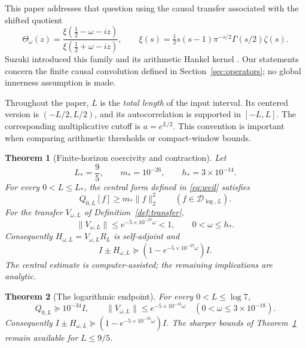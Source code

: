 \documentclass[11pt]{article}
\numberwithin{equation}{section}
\newtheorem{theorem}{Theorem}[section]
\theoremstyle{definition}
\theoremstyle{remark}
\newcommand{\DD}{\mathcal D}
\newcommand{\norm}[1]{\lVert#1\rVert}
\newcommand{\Lstar}{L_*}
\newcommand{\mstar}{m_*}
\newcommand{\hstar}{h_*}
\begin{document}
This paper addresses that question using the causal transfer associated with
the shifted quotient
\begin{equation}\label{eq:theta}
 \Theta_\omega(z)=
 \frac{\xi(\tfrac12-\omega-iz)}{\xi(\tfrac12+\omega-iz)},\qquad
 \xi(s)=\tfrac12s(s-1)\pi^{-s/2}\Gamma(s/2)\zeta(s).
\end{equation}
Suzuki introduced this family and its arithmetic Hankel kernel
\cite{Suzuki2016}. Our statements concern the finite causal convolution
defined in Section~\ref{sec:operators}; no global innerness assumption is made.

Throughout the paper, $L$ is the \emph{total length} of the input interval.
Its centered version is $(-L/2,L/2)$, and its autocorrelation is supported
in $[-L,L]$. The corresponding multiplicative cutoff is $a=e^{L/2}$.
This convention is important when comparing arithmetic thresholds or
compact-window bounds.

\begin{theorem}[Finite-horizon coercivity and contraction]\label{thm:main}
Let
\[
 \Lstar=\frac95,\qquad \mstar=10^{-26},\qquad \hstar=3\times10^{-14}.
\]
For every $0<L\le\Lstar$, the central form defined in
\eqref{eq:weil} satisfies
\begin{equation}\label{eq:maincentral}
 Q_{0,L}[f]\ge\mstar\norm f_2^2\qquad(f\in\DD_{\log,L}).
\end{equation}
For the transfer $V_{\omega,L}$ of Definition~\ref{def:transfer},
\begin{equation}\label{eq:maintransfer}
 \norm{V_{\omega,L}}\le e^{-5\times10^{-27}\omega}<1,
 \qquad 0<\omega\le\hstar.
\end{equation}
Consequently $H_{\omega,L}=V_{\omega,L}R_L$ is self-adjoint and
\begin{equation}\label{eq:mainreflection}
 I\pm H_{\omega,L}\succeq
 (1-e^{-5\times10^{-27}\omega})I.
\end{equation}
The central estimate is computer-assisted; the remaining implications are
analytic.
\end{theorem}

\begin{theorem}[The logarithmic endpoint]\label{thm:endpoint-main}
For every $0<L\le\log7$,
\[
 Q_{0,L}\succeq10^{-34}I,\qquad
 \norm{V_{\omega,L}}\le e^{-5\times10^{-35}\omega}
 \quad(0<\omega\le3\times10^{-18}).
\]
Consequently $I\pm H_{\omega,L}\succeq(1-e^{-5\times10^{-35}\omega})I$.
The sharper bounds of Theorem~\ref{thm:main} remain available for $L\le9/5$.
\end{theorem}
\end{document}
